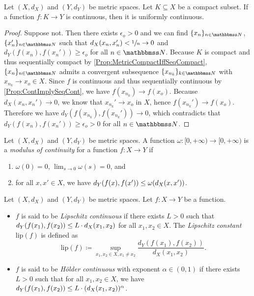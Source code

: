 \documentclass[screen,single]{techreport}
\numberwithin{equation}{section}
\begin{document}
\begin{proposition}\label{Prop:DomainCompactImplyContImplyUCont}
  Let $(X,d_X)$ and $(Y,d_Y)$ be metric spaces.
  Let $K \subseteq X$ be a compact subset.
  If a function $f : K \to Y$ is continuous, then it is uniformly continuous.
\end{proposition}
\begin{proof}
  Suppose not.
  Then there exists $\epsilon_o > 0$ and we can find $\{x_n\}_{n \in \bbN}$, $\{x_n'\}_{n\in \bbN}$ such that $d_X(x_n,x_n') < \sfrac{1}{n} \rightarrow 0$ and $d_Y(f(x_n),f(x_n')) \ge \epsilon_o$ for all $n\in \bbN$.
  Because $K$ is compact and thus sequentially compact by \cref{Prop:MetricCompactIffSeqCompact}, $\{x_n\}_{n\in\bbN}$ admits a convergent subsequence $\{x_{n_k}\}_{k \in \bbN}$ with $x_{n_k} \rightarrow x_o \in X$.
  Since $f$ is continuous and thus sequentially continuous by \cref{Prop:ContImplySeqCont}, we have $f(x_{n_k}) \rightarrow f(x_o)$.
  Because $d_X(x_n,x_n') \rightarrow 0$, we know that $x_{n_k}' \rightarrow x_o$ in $X$, hence $f(x_{n_k}') \rightarrow f(x_o)$.
  Therefore we have $d_Y(f(x_{n_k}), f(x_{n_k}')) \rightarrow 0$, which contradicts that $d_Y(f(x_n),f(x_n')) \ge \epsilon_o > 0$ for all $n \in \bbN$.
\end{proof}

\begin{definition}\label{De:ModulusOfContinuity}
  Let $(X,d_X)$ and $(Y,d_Y)$ be metric spaces.
  A function $\omega : [0,+\infty) \to [0,+\infty)$ is a \emph{modulus of continuity} for a function $f : X \to Y$ if
  \begin{enumerate}
    \item $\omega(0) = 0$, $\lim_{s \to 0} \omega(s) = 0$, and
    \item for all $x,x' \in X$, we have $d_Y({f(x),f(x')}) \le \omega(d_X(x,x'))$.
  \end{enumerate}
\end{definition}

\begin{definition}\label{De:LipschitzHolder}
  Let $(X,d_X)$ and $(Y,d_Y)$ be metric spaces.
  Let $f : X \to Y$ be a function.
  \begin{itemize}
    \item $f$ is said to be \emph{Lipschitz continuous} if there exists $L > 0$ such that $d_Y({f(x_1),f(x_2)}) \le L \cdot d_X(x_1,x_2)$ for all $x_1,x_2 \in X$.
    The \emph{Lipschitz constant} $\mathrm{lip}(f)$ is defined as
    \[
    \mathrm{lip}(f) \coloneqq \sup_{x_1,x_2 \in X, x_1 \neq x_2} \frac{d_Y(f(x_1),f(x_2))}{d_X(x_1,x_2)}.
    \]
    \item $f$ is said to be \emph{H{\"o}lder continuous} with exponent $\alpha \in (0,1)$ if there exists $L > 0$ such that for all $x_1,x_2 \in X$, we have $d_Y({f(x_1),f(x_2)}) \le L \cdot ({d_X(x_1,x_2)})^\alpha$.
  \end{itemize}
\end{definition}
\end{document}
